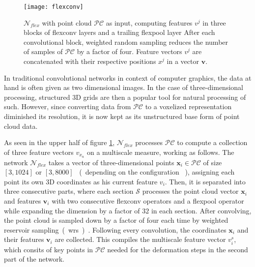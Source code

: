 \begin{figure}
   \begin{center}
   \texttt{[image: flexconv]}
   \caption{$\mathcal{N}_{flex}$ with point cloud $\mathcal{PC}$ as input, computing features $v^j$ in three blocks of flexconv layers and a trailing flexpool layer  After each convolutional block, weighted random sampling reduces the number of samples of $\mathcal{PC}$ by a factor of four. Feature vectors $v^j$ are concatenated with their respective positions $x^j$ in a vector $\textbf{v}$.}
   \label{fig:flexconv}
   \end{center}
 \end{figure}

In traditional convolutional networks in context of computer graphics, the data at hand is often given as two dimensional images.
 In the case of three-dimensional processing, structured 3D grids are then a popular tool for natural processing 
 of such. However, since converting data from $\mathcal{PC}$ to a voxelized representation diminished its resolution, 
 it is now kept as its unstructured base form of point cloud data. 

As seen in the upper half of figure \ref{fig:flexconv}, $\mathcal{N}_{flex}$ processes $\mathcal{PC}$ to compute
 a collection of three feature vectors $v_{x_n}$ on a multiscale measure, working as follows.
 The network $\mathcal{N}_{flex}$ takes a vector of three-dimensional points $\textbf{x}_i \in \mathcal{PC}$ 
 of size $[3,1024]$ or $[3,8000]$ ~(~depending on the configuration ~), assigning each point its own 3D coordinates
  as his current feature $v_i$.
Then, it is separated into three consecutive parts, where each section $\mathcal{S}$ processes the point cloud vector $\textbf{x}_i$ and features $\textbf{v}_i$
 with two consecutive flexconv operators and a flexpool operator while expanding the dimension by a factor of $32$ in each section.
After convolving, the point cloud is sampled down by a factor of four each time by weighted reservoir sampling~(~wrs~)~. 
Following every convolution, the coordinates $\textbf{x}_i$ and their features $\textbf{v}_i$ are collected. 
This compiles the multiscale feature vector $v_i^s$, which consits of key points in $\mathcal{PC}$ needed for the deformation steps in the second part of the network.



